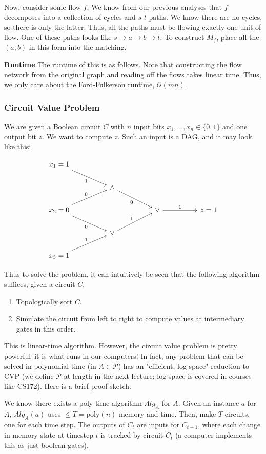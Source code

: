 \begin{algothm}
\begin{proof*}
        Now, consider some flow $f$. We know from our previous analyses that $f$ decomposes into a collection of cycles and $s$-$t$ paths. We know there are no cycles, so there is only the latter.
        Thus, all the paths must be flowing exactly one unit of flow. One of these paths looks like $s \to a \to b \to t$. To construct $M_f$, place all the $(a, b)$ in this form into the matching.
    \end{proof*}

    \textbf{Runtime} The runtime of this is as follows. Note that constructing the flow network from the original graph and reading off the flows takes linear time.
    Thus, we only care about the Ford-Fulkerson runtime, $\mathcal{O}(mn)$.
\end{algothm}

\subsubsection{Circuit Value Problem}
We are given a Boolean circuit $C$ with $n$ input bits $x_1, \dots, x_n \in \{0, 1\}$ and one output bit $z$. We want to compute $z$.
Such an input is a DAG, and it may look like this:

\[\begin{tikzcd}
	{x_1 = 1} \\
	&& \land \\
	{x_2 =0} &&&& \lor && {z =1} \\
	&& \lor \\
	{x_3=1}
	\arrow["1"', from=1-1, to=2-3]
	\arrow["0", from=3-1, to=2-3]
	\arrow["0"', from=2-3, to=3-5]
	\arrow["0"', from=3-1, to=4-3]
	\arrow["1", from=5-1, to=4-3]
	\arrow["1", from=4-3, to=3-5]
	\arrow["1", from=3-5, to=3-7]
\end{tikzcd}\]

Thus to solve the problem, it can intuitively be seen that the following algorithm suffices, given a circuit $C$,
\begin{enumerate}
    \item Topologically sort $C$.
    \item Simulate the circuit from left to right to compute values at intermediary gates in this order.
\end{enumerate}

This is linear-time algorithm. However, the circuit value problem is pretty powerful--it is what runs in our computers! In fact,
any problem that can be solved in polynomial time (in $A \in \mathcal{P}$) has an "efficient, log-space" reduction to CVP (we define $\mathcal{P}$
at length in the next lecture; log-space is covered in courses like CS172). Here is a brief proof sketch.
\begin{proof*}[Sketch]
    We know there exists a poly-time algorithm $Alg_A$ for $A$. Given an instance $a$ for $A$,
    $Alg_A(a)$ uses $\leq T = \text{poly}(n)$ memory and time. Then, make $T$ circuits, one for each time step.
    The outputs of $C_t$ are inputs for $C_{t + 1}$, where each change in memory state at timestep $t$ is tracked by circuit $C_t$ (a
    computer implements this as just boolean gates).
\end{proof*}


